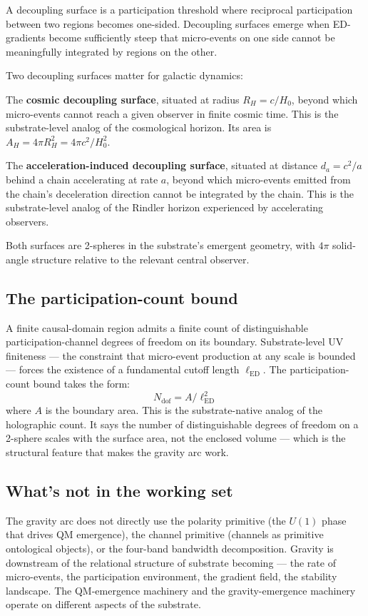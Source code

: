 \documentclass[11pt,a4paper]{article}
\begin{document}
A decoupling surface is a participation threshold where reciprocal participation between two regions becomes one-sided. Decoupling surfaces emerge when ED-gradients become sufficiently steep that micro-events on one side cannot be meaningfully integrated by regions on the other.

Two decoupling surfaces matter for galactic dynamics:

The \textbf{cosmic decoupling surface}, situated at radius $R_H = c/H_0$, beyond which micro-events cannot reach a given observer in finite cosmic time. This is the substrate-level analog of the cosmological horizon. Its area is $A_H = 4\pi R_H^2 = 4\pi c^2/H_0^2$.

The \textbf{acceleration-induced decoupling surface}, situated at distance $d_a = c^2/a$ behind a chain accelerating at rate $a$, beyond which micro-events emitted from the chain's deceleration direction cannot be integrated by the chain. This is the substrate-level analog of the Rindler horizon experienced by accelerating observers.

Both surfaces are 2-spheres in the substrate's emergent geometry, with $4\pi$ solid-angle structure relative to the relevant central observer.

\subsection{The participation-count bound}

A finite causal-domain region admits a finite count of distinguishable participation-channel degrees of freedom on its boundary. Substrate-level UV finiteness --- the constraint that micro-event production at any scale is bounded --- forces the existence of a fundamental cutoff length $\ell_{\mathrm{ED}}$. The participation-count bound takes the form:
\[
N_{\mathrm{dof}} = A / \ell_{\mathrm{ED}}^{2}
\]
where $A$ is the boundary area. This is the substrate-native analog of the holographic count. It says the number of distinguishable degrees of freedom on a 2-sphere scales with the surface area, not the enclosed volume --- which is the structural feature that makes the gravity arc work.

\subsection{What's not in the working set}

The gravity arc does not directly use the polarity primitive (the $U(1)$ phase that drives QM emergence), the channel primitive (channels as primitive ontological objects), or the four-band bandwidth decomposition. Gravity is downstream of the relational structure of substrate becoming --- the rate of micro-events, the participation environment, the gradient field, the stability landscape. The QM-emergence machinery and the gravity-emergence machinery operate on different aspects of the substrate.
\end{document}
